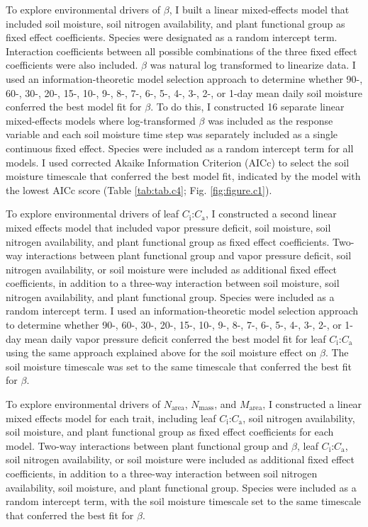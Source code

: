 To explore environmental drivers of $\beta$, I built a linear mixed-effects model that included soil moisture, soil nitrogen availability, and plant functional group as fixed effect coefficients. Species were designated as a random intercept term. Interaction coefficients between all possible combinations of the three fixed effect coefficients were also included. $\beta$ was natural log transformed to linearize data. I used an information-theoretic model selection approach to determine whether 90-, 60-, 30-, 20-, 15-, 10-, 9-, 8-, 7-, 6-, 5-, 4-, 3-, 2-, or 1-day mean daily soil moisture conferred the best model fit for $\beta$. To do this, I constructed 16 separate linear mixed-effects models where log-transformed $\beta$ was included as the response variable and each soil moisture time step was separately included as a single continuous fixed effect. Species were included as a random intercept term for all models. I used corrected Akaike Information Criterion (AICc) to select the soil moisture timescale that conferred the best model fit, indicated by the model with the lowest AICc score (Table \ref{tab:tab.c4}; Fig. \ref{fig:figure.c1}).

To explore environmental drivers of leaf $C_\mathrm{i}$:$C_\mathrm{a}$, I constructed a second linear mixed effects model that included vapor pressure deficit, soil moisture, soil nitrogen availability, and plant functional group as fixed effect coefficients. Two-way interactions between plant functional group and vapor pressure deficit, soil nitrogen availability, or soil moisture were included as additional fixed effect coefficients, in addition to a three-way interaction between soil moisture, soil nitrogen availability, and plant functional group. Species were included as a random intercept term. I used an information-theoretic model selection approach to determine whether 90-, 60-, 30-, 20-, 15-, 10-, 9-, 8-, 7-, 6-, 5-, 4-, 3-, 2-, or 1-day mean daily vapor pressure deficit conferred the best model fit for leaf $C_\mathrm{i}$:$C_\mathrm{a}$ using the same approach explained above for the soil moisture effect on $\beta$. The soil moisture timescale was set to the same timescale that conferred the best fit for $\beta$.

To explore environmental drivers of $N_\mathrm{area}$, $N_\mathrm{mass}$, and $M_\mathrm{area}$, I constructed a linear mixed effects model for each trait, including leaf $C_\mathrm{i}$:$C_\mathrm{a}$, soil nitrogen availability, soil moisture, and plant functional group as fixed effect coefficients for each model. Two-way interactions between plant functional group and $\beta$, leaf $C_\mathrm{i}$:$C_\mathrm{a}$, soil nitrogen availability, or soil moisture were included as additional fixed effect coefficients, in addition to a three-way interaction between soil nitrogen availability, soil moisture, and plant functional group. Species were included as a random intercept term, with the soil moisture timescale set to the same timescale that conferred the best fit for $\beta$.

